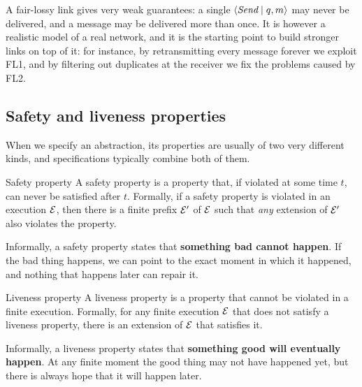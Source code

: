 \begin{framedobs}{}
  A fair-lossy link gives very weak guarantees: a single $\left\langle \textit{Send} \mid q, m \right\rangle$ may never be delivered, and a message may be delivered more than once. It is however a realistic model of a real network, and it is the starting point to build stronger links on top of it: for instance, by retransmitting every message forever we exploit FL1, and by filtering out duplicates at the receiver we fix the problems caused by FL2.
\end{framedobs}

\subsection{Safety and liveness properties}

When we specify an abstraction, its properties are usually of two very different kinds, and specifications typically combine both of them.

\begin{frameddefn}[label={def:safety}]{Safety property}
  A safety property is a property that, if violated at some time $t$, can never be satisfied after $t$. Formally, if a safety property is violated in an execution $\mathcal{E}$, then there is a finite prefix $\mathcal{E}'$ of $\mathcal{E}$ such that \textit{any} extension of $\mathcal{E}'$ also violates the property.
\end{frameddefn}

Informally, a safety property states that \textbf{something bad cannot happen}. If the bad thing happens, we can point to the exact moment in which it happened, and nothing that happens later can repair it.

\begin{frameddefn}[label={def:liveness}]{Liveness property}
  A liveness property is a property that cannot be violated in a finite execution. Formally, for any finite execution $\mathcal{E}$ that does not satisfy a liveness property, there is an extension of $\mathcal{E}$ that satisfies it.
\end{frameddefn}

Informally, a liveness property states that \textbf{something good will eventually happen}. At any finite moment the good thing may not have happened yet, but there is always hope that it will happen later.

